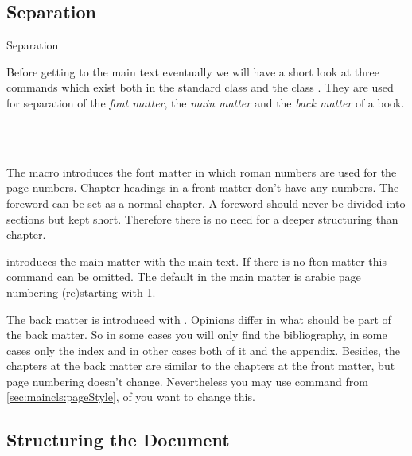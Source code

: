 \subsection{Separation}{Separation\protect{}}
\label{sec:maincls.separation}

Before getting to the main text eventually we will
have a short look at three commands which exist both in the standard class
 and the {\KOMAScript} class . They are used for
separation of the \emph{font matter}, the \emph{main
  matter} and the \emph{back matter} of
a book.

\begin{Declaration}
  \\
  \\
\end{Declaration}%
%
%
%
The macro  introduces the font matter in which roman
numbers are used for the page numbers. Chapter headings in a front matter
don't have any numbers.  The foreword can be set as a normal chapter.
A foreword should never be divided into sections but kept short.
Therefore there is no need for a deeper structuring than chapter.

 introduces the main matter with the main text. If there is
no fton matter this command can be omitted. The default in the main matter is
arabic page numbering (re)starting with 1.

The back matter is introduced with . Opinions differ in
what should be part of the back matter. So in some cases you will only find
the bibliography, in some cases only the
index and in other cases both of it and the appendix.
Besides, the chapters at the back matter are similar to the chapters at the
front matter, but page numbering doesn't change. Nevertheless you may use
command  from \autoref{sec:maincls:pageStyle},
 of you want to change this.
%
%
%
%


\subsection{Structuring the Document}
\label{sec:maincls.structure}

